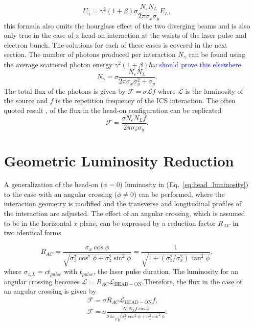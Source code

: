 \documentclass[../main.tex]{subfiles}
\begin{document}
\begin{equation}
U_{\gamma} = \gamma^{2}\left(1+\beta\right)\sigma\frac{N_{e}N_{L}}{2\pi\sigma_{x}\sigma_{y}}E_{L},
\label{eq:total_interaction_energy_simplified}
\end{equation}
this formula also omits the hourglass effect of the two diverging beams and is also only true in the case of a head-on interaction at the waists of the laser pulse and electron bunch. The solutions for each of these cases is covered in the next section. The number of photons produced per interaction $N_{\gamma}$ can be found using the average scattered photon energy $\gamma^{2}\left(1+\beta\right)\hbar\omega$ \textcolor{blue}{should prove this elsewhere}
\begin{equation}
N_{\gamma} = \sigma\frac{N_{e}N_{L}}{2\pi\sigma_{x}\sigma_{y}^{2}+\sigma_{y}}.
\label{eq:no_photon_headon}
\end{equation}
The total flux of the photons is given by $\mathcal{F} = \sigma\mathcal{L}f$ where $\mathcal{L}$ is the luminosity of the source and $f$ is the repetition frequency of the ICS interaction. The often quoted result \cite{krafft2010compton,curatolo2017analytical}, of the flux in the head-on configuration can be replicated
\begin{equation}
\mathcal{F} = \frac{\sigma N_{e}N_{L}f}{2\pi\sigma_{x}\sigma_{y}}.
\label{eq:headon_flux}
\end{equation}

\section{Geometric Luminosity Reduction}
\label{sec:geometric_luminosity_reduction}

A generalization of the head-on ($\phi = 0$) luminosity in (Eq.~\ref{eq:head_luminosity}) to the case with an angular crossing ($\phi \neq 0$) can be performed, where the interaction geometry is modified and the transverse and longitudinal profiles of the interaction are adjusted. The effect of an angular crossing, which is assumed to be in the horizontal $x$ plane, can be expressed by a reduction factor $R_{AC}$ in two identical forms \cite{suzuki1976general,miyahara2008luminosity}

\begin{equation}
R_{AC} = \frac{\sigma_{x}\cos\phi}{\sqrt{\sigma_{x}^{2}\cos^{2}\phi+\sigma_{z}^{2}\sin^{2}\phi}} = \frac{1}{\sqrt{1+\left(\sigma_{z}^{2}/\sigma_{x}^{2}\right)\tan^{2}\phi}},
\label{eq:angular_crossing_factor}    
\end{equation}
where $\sigma_{z,L} = ct_{pulse}$ with $t_{pulse}$, the laser pulse duration. The luminosity for an angular crossing becomes $\mathcal{L} = R_{AC}\mathcal{L}_{\mathrm{HEAD-ON}}$.Therefore, the flux in the case of an angular crossing is given by 
\begin{gather}
\mathcal{F} = \sigma R_{AC}\mathcal{L}_{\mathrm{HEAD-ON}}f, \\
\mathcal{F} = \sigma\frac{N_{e}N_{L}f\cos\phi}{2\pi\sigma_{y}\sqrt{\sigma_{x}^{2}\cos^{2}\phi + \sigma_{z}^{2}\sin^{2}\phi}}.
\label{eq:crossing_angle_flux}    
\end{gather}
\end{document}
